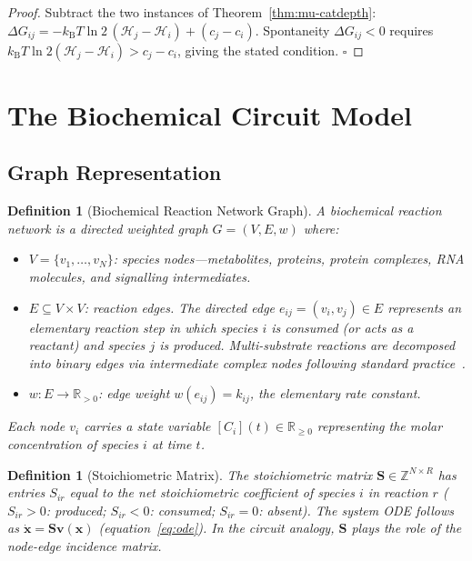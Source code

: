 \documentclass[twocolumn,10pt,a4paper]{article}
\newcommand{\kB}{k_{\mathrm{B}}}
\newcommand{\Hcat}{\mathcal{H}}
\newtheorem{definition}[theorem]{Definition}
\begin{document}
\begin{proof}
Subtract the two instances of Theorem~\ref{thm:mu-catdepth}:
$\Delta G_{ij} = -\kB T\ln 2\,(\Hcat_j-\Hcat_i)+(c_j-c_i)$.
Spontaneity $\Delta G_{ij}<0$ requires
$\kB T\ln 2(\Hcat_j-\Hcat_i) > c_j-c_i$, giving the stated condition.
$\square$
\end{proof}

\section{The Biochemical Circuit Model}
\label{sec:circuit}

\subsection{Graph Representation}
\label{sec:circuit-graph}

\begin{definition}[Biochemical Reaction Network Graph]
\label{def:graph}
A \emph{biochemical reaction network} is a directed weighted graph
$G=(V,E,w)$ where:
\begin{itemize}[noitemsep]
  \item $V=\{v_1,\ldots,v_N\}$: species nodes---metabolites, proteins, protein
        complexes, RNA molecules, and signalling intermediates.
  \item $E\subseteq V\times V$: reaction edges.  The directed edge
        $e_{ij}=(v_i,v_j)\in E$ represents an elementary reaction step in
        which species $i$ is consumed (or acts as a reactant) and species $j$
        is produced.  Multi-substrate reactions are decomposed into binary
        edges via intermediate complex nodes following standard
        practice~\cite{HeinrichSchuster1996,Klipp2005}.
  \item $w:E\to\mathbb{R}_{>0}$: edge weight $w(e_{ij})=k_{ij}$, the
        elementary rate constant.
\end{itemize}
Each node $v_i$ carries a state variable $[C_i](t)\in\mathbb{R}_{\geq 0}$
representing the molar concentration of species $i$ at time $t$.
\end{definition}

\begin{definition}[Stoichiometric Matrix]
\label{def:stoich}
The \emph{stoichiometric matrix} $\mathbf{S}\in\mathbb{Z}^{N\times R}$ has
entries $S_{ir}$ equal to the net stoichiometric coefficient of species $i$ in
reaction $r$ ($S_{ir}>0$: produced; $S_{ir}<0$: consumed; $S_{ir}=0$:
absent).  The system ODE follows as $\dot{\mathbf{x}}=\mathbf{S}\mathbf{v}(\mathbf{x})$
(equation~\ref{eq:ode}).  In the circuit analogy, $\mathbf{S}$ plays the role
of the node-edge incidence matrix.
\end{definition}
\end{document}
